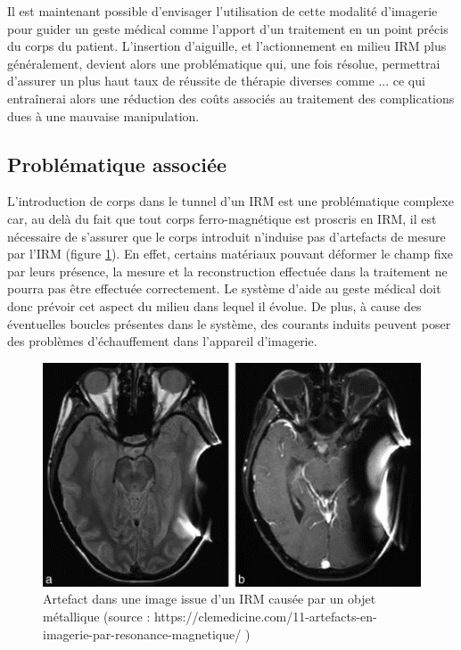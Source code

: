 \documentclass[10pt, a4paper]{article}
\begin{document}
Il est maintenant possible d'envisager l'utilisation de cette modalité d'imagerie pour guider un geste médical comme l'apport d'un traitement en un point précis du corps du patient. L'insertion d'aiguille, et l'actionnement en milieu IRM plus généralement, devient alors une problématique qui, une fois résolue, permettrai d'assurer un plus haut taux de réussite de thérapie diverses comme ... ce qui entraînerai alors une réduction des coûts associés au traitement des complications dues à une mauvaise manipulation.
    
    \subsection{Problématique associée}
\qquad L'introduction de corps dans le tunnel d'un IRM est une problématique complexe car, au delà du fait que tout corps ferro-magnétique est proscris en IRM, il est nécessaire de s'assurer que le corps introduit n'induise pas d'artefacts de mesure par l'IRM (figure \ref{fig:IRM-Artefact}). En effet, certains matériaux pouvant déformer le champ fixe par leurs présence, la mesure et la reconstruction effectuée dans la traitement ne pourra pas être effectuée correctement. Le système d'aide au geste médical doit donc prévoir cet aspect du milieu dans lequel il évolue. De plus, à cause des éventuelles boucles présentes dans le système, des courants induits peuvent poser des problèmes d'échauffement dans l'appareil d'imagerie.


\begin{figure}[ht!]
\centering
\includegraphics[scale=0.5]{ImageIntro/artefacts.png}
\caption{Artefact dans une image issue d'un IRM causée par un objet métallique (source : https://clemedicine.com/11-artefacts-en-imagerie-par-resonance-magnetique/ ) }
\label{fig:IRM-Artefact}
\end{figure}
    
\end{document}

